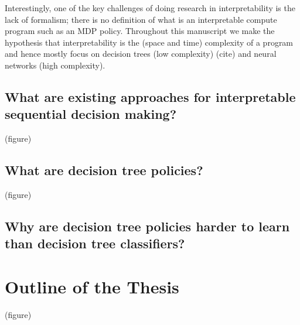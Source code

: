 Interestingly, one of the key challenges of doing research in interpretability is the lack of formalism; there is no definition of what is an interpretable compute program such as an MDP policy. Throughout this manuscript we make the hypothesis that interpretability is the (space and time) complexity of a program and hence mostly focus on decision trees (low complexity) (cite) and neural networks (high complexity).  

\subsection{What are existing approaches for interpretable sequential decision making?}
(figure)

\subsection{What are decision tree policies?}
(figure)

\subsection{Why are decision tree policies harder to learn than decision tree classifiers?}

\section{Outline of the Thesis}
(figure)